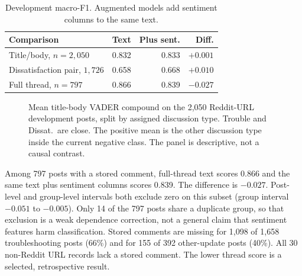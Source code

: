 \documentclass[conference,letterpaper]{IEEEtran}
\begin{document}
\begin{table}[t]
\caption{Development macro-F1. Augmented models add sentiment columns to the same text.}
\label{tab:sent}
\centering
\footnotesize
\setlength{\tabcolsep}{3pt}
\begin{tabular}{lrrr}
\toprule
Comparison & Text & Plus sent. & Diff. \\
\midrule
Title/body, $n{=}2{,}050$ & 0.832 & 0.833 & $+0.001$ \\
Dissatisfaction pair, $1{,}726$ & 0.658 & 0.668 & $+0.010$ \\
Full thread, $n{=}797$ & 0.866 & 0.839 & $-0.027$ \\
\bottomrule
\end{tabular}
\end{table}

\begin{figure}[t]
\centering
{}
\caption{Mean title-body VADER compound on the 2,050 Reddit-URL development posts, split by assigned discussion type. Trouble and Dissat.\ are close. The positive mean is the other discussion type inside the current negative class. The panel is descriptive, not a causal contrast.}
\label{fig:valence}
\end{figure}

Among 797 posts with a stored comment, full-thread text scores 0.866 and the same text plus sentiment columns scores 0.839. The difference is $-0.027$. Post-level and group-level intervals both exclude zero on this subset (group interval $-0.051$ to $-0.005$). Only 14 of the 797 posts share a duplicate group, so that exclusion is a weak dependence correction, not a general claim that sentiment features harm classification. Stored comments are missing for 1,098 of 1,658 troubleshooting posts (66\%) and for 155 of 392 other-update posts (40\%). All 30 non-Reddit URL records lack a stored comment. The lower thread score is a selected, retrospective result.
\end{document}
